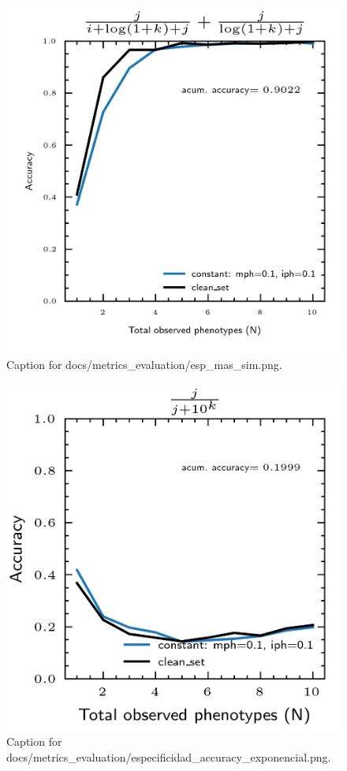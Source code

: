 \documentclass{article}
\begin{document}
\begin{figure}[h] \centering \includegraphics{docs/metrics_evaluation/esp_mas_sim.png} \caption{Caption for docs/metrics_evaluation/esp_mas_sim.png.} \end{figure}
\begin{figure}[h] \centering \includegraphics{docs/metrics_evaluation/especificidad_accuracy_exponencial.png} \caption{Caption for docs/metrics_evaluation/especificidad_accuracy_exponencial.png.} \end{figure}
\end{document}
